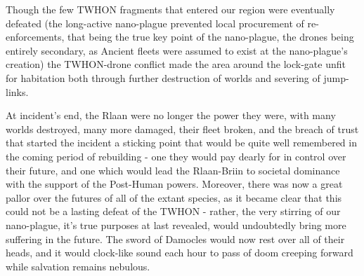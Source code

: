 Though the few TWHON fragments that entered our region were eventually
defeated (the long-active nano-plague prevented local procurement of
re-enforcements, that being the true key point of the nano-plague, the
drones being entirely secondary, as Ancient fleets were assumed to
exist at the nano-plague's creation) the TWHON-drone conflict made the
area around the lock-gate unfit for habitation both through further
destruction of worlds and severing of jump-links.

At incident's end, the Rlaan were no longer the power they were, with
many worlds destroyed, many more damaged, their fleet broken, and the
breach of trust that started the incident a sticking point that would
be quite well remembered in the coming period of rebuilding - one they
would pay dearly for in control over their future, and one which would
lead the Rlaan-Briin to societal dominance with the support of the
Post-Human powers. Moreover, there was now a great pallor over the
futures of all of the extant species, as it became clear that this
could not be a lasting defeat of the TWHON - rather, the very stirring
of our nano-plague, it's true purposes at last revealed, would
undoubtedly bring more suffering in the future. The sword of Damocles
would now rest over all of their heads, and it would clock-like sound
each hour to pass of doom creeping forward while salvation remains
nebulous.



